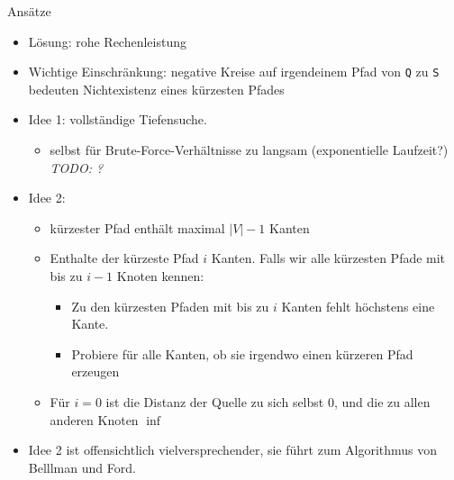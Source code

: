 \begin{frame}{Ansätze}

\begin{itemize}
\item
  Lösung: rohe %
  Rechenleistung
\item
  Wichtige Einschränkung: negative Kreise auf irgendeinem Pfad von
  \texttt{Q} zu \texttt{S} bedeuten Nichtexistenz eines kürzesten Pfades
\item
  Idee 1: vollständige Tiefensuche.

  \begin{itemize}
  \itemsep1pt\parskip0pt
  \item
    selbst für Brute-Force-Verhältnisse zu langsam (exponentielle
    Laufzeit?) \emph{TODO: ?}
  \end{itemize}
\item
  Idee 2:

  \begin{itemize}
  \itemsep1pt\parskip0pt
  \item
    kürzester Pfad enthält maximal $|V| - 1$ Kanten
  \item
    Enthalte der kürzeste Pfad $i$ Kanten. Falls wir alle kürzesten
    Pfade mit bis zu $i - 1$ Knoten kennen:

    \begin{itemize}
    \itemsep1pt\parskip0pt
    \item
      Zu den kürzesten Pfaden mit bis zu $i$ Kanten fehlt höchstens eine
      Kante.
    \item
      Probiere für alle Kanten, ob sie irgendwo einen kürzeren Pfad
      erzeugen
    \end{itemize}
  \item
    Für $i = 0$ ist die Distanz der Quelle zu sich selbst 0, und die zu
    allen anderen Knoten $\inf$
  \end{itemize}
\item
  Idee 2 ist offensichtlich vielversprechender, sie führt zum
  Algorithmus von Belllman und Ford.
\end{itemize}

\end{frame}


